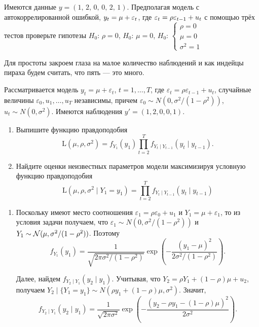 \begin{problem}
Имеются данные $y=(1,\, 2,\, 0,\,  0,\, 2,\, 1)$. Предполагая модель с автокоррелированной ошибкой, $y_t=\mu+\varepsilon_t$, где $\varepsilon_t=\rho \varepsilon_{t-1}+u_t$ с помощью трёх тестов проверьте гипотезы
$H_0$: $\rho=0$,
$H_0$: $\mu=0$,
$H_0$: $\begin{cases}
\rho=0 \\
\mu = 0 \\
\sigma^2=1
\end{cases}$

\begin{sol}
Для простоты закроем глаза на малое количество наблюдений и как индейцы пираха будем считать, что пять — это много.
\end{sol}
\end{problem}


\begin{problem}
Рассматривается модель $y_t = \mu + \varepsilon_t$, $t = 1,\ldots,T$, где $\varepsilon_t = \rho \varepsilon_{t-1} + u_t$, случайные величины $\varepsilon_0, u_1,\dots,u_T$ независимы, причем $\varepsilon_0 \sim N(0,\sigma^2/(1 - \rho^2))$, $u_t \sim N(0,\sigma^2)$. Имеются наблюдения $y' = (1, 2, 0, 0, 1)$.
\begin{enumerate}
  \item Выпишите функцию правдоподобия
  \[
  \mathrm{L}(\mu, \rho, \sigma^2) = f_{Y_1}(y_1)\prod_{t=2}^{T}f_{Y_t \mid Y_{t-1}}(y_t \mid y_{t-1}).
  \]
  \item Найдите оценки неизвестных параметров модели максимизируя условную функцию правдоподобия
  \[
  \mathrm{L}(\mu, \rho, \sigma^2 \mid Y_1 = y_1) = \prod_{t=2}^{T}f_{Y_t \mid Y_{t-1}}(y_t \mid y_{t-1})
  \]
\end{enumerate}


\begin{sol}
\begin{enumerate}
  \item Поскольку имеют место соотношения $\varepsilon_1 = \rho \varepsilon_0 + u_1$ и $Y_1 =\mu + \varepsilon_1$, то из условия задачи получаем, что $\varepsilon_1 \sim N(0,\sigma^2 / (1 - \rho^2))$
и $Y_1 \sim \mathcal{N}(\mu,\sigma^2 / (1 - \rho^2))$. Поэтому
\[
f_{Y_1}(y_1) = \frac{1}{\sqrt{2\pi\sigma^2/(1-\rho^2)}}\exp{\left(-\frac{(y_1 - \mu)^2}{2\sigma^2/(1 - \rho^2)}\right)}.
\]

Далее, найдем $f_{Y_2 \mid Y_1}(y_2 \mid y_1)$. Учитывая, что $Y_2 = \rho Y_1 + (1- \rho) \mu + u_2$, получаем $Y_2 \mid \{Y_1 = y_1\} \sim N(\rho y_1 + (1- \rho) \mu, \sigma^2)$. Значит,
\[
f_{Y_2 \mid Y_1}(y_2 \mid y_1) = \frac{1}{\sqrt{2\pi\sigma^2}}\exp{\left(-\frac{(y_2 - \rho y_1 - (1- \rho) \mu)^2}{2\sigma^2}\right)}.
\]


\end{enumerate}
\end{sol}
\end{problem}
